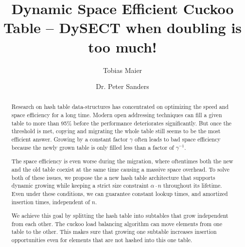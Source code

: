 \documentclass[a4paper,UKenglish]{lipics-v2016}
\title{Dynamic Space Efficient Cuckoo Table -- DySECT when doubling is too much!} %
\author[1]{Tobias Maier}
\author[1]{Dr. Peter Sanders}
\affil[1]{Karlsruhe Institute of Technology, Karlsruhe, Deutschland\\
  \texttt{\{t.maier, sanders\}@kit.edu}}
\begin{document}
\maketitle

\begin{abstract}
Research on hash table data-structures has concentrated on optimizing
the speed and space efficiency for a long time.  Modern open
addressing techniques can fill a given table to more than 95\% before
the performance deteriorates significantly.  But once the threshold is
met, copying and migrating the whole table still seems to be the most
efficient answer.
Growing by a constant factor $\gamma$ often leads
to bad space efficiency because the newly grown table is only filled
less than a factor of $\gamma^{-1}$.

The space efficiency is even worse during the migration, where
oftentimes both the new and the old table coexist at the same time
causing a massive space overhead.  To solve both of these issues, we
propose the a new hash table architecture that supports dynamic
growing while keeping a strict size constraint $\alpha \cdot n$
throughout its lifetime.  Even under these conditions, we can
guarantee constant lookup times, and amortized insertion times,
independent of $n$.

We achieve this goal by splitting the hash table into subtables that
grow independent from each other.  The cuckoo load balancing
algorithm can move elements from one table to the other.  This makes
sure that growing one subtable increases insertion opportunities even
for elements that are not hashed into this one table.
 \end{abstract}
\end{document}

